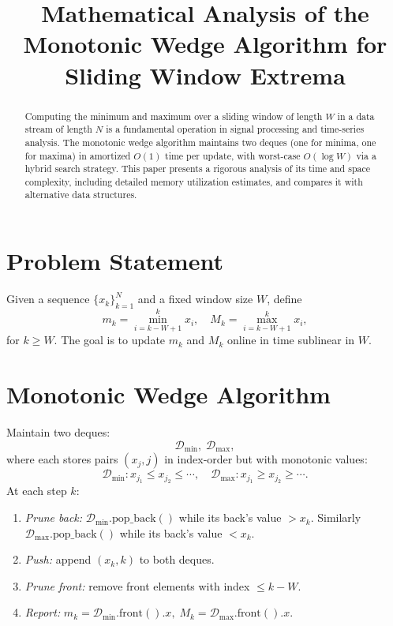 \documentclass[12pt]{article}
\title{Mathematical Analysis of the Monotonic Wedge Algorithm for Sliding Window Extrema}
\date{}
\begin{document}
\maketitle

\begin{abstract}
Computing the minimum and maximum over a sliding window of length \(W\) in a data stream of length \(N\) is a fundamental operation in signal processing and time-series analysis.  The monotonic wedge algorithm maintains two deques (one for minima, one for maxima) in amortized \(O(1)\) time per update, with worst-case \(O(\log W)\) via a hybrid search strategy.  This paper presents a rigorous analysis of its time and space complexity, including detailed memory utilization estimates, and compares it with alternative data structures.
\end{abstract}

\section{Problem Statement}
Given a sequence \(\{x_k\}_{k=1}^N\) and a fixed window size \(W\), define
\[
m_k = \min_{i=k-W+1}^k x_i,
\quad
M_k = \max_{i=k-W+1}^k x_i,
\]
for \(k\ge W\).  The goal is to update \(m_k\) and \(M_k\) online in time sublinear in \(W\).

\section{Monotonic Wedge Algorithm}
Maintain two deques:
\[
\mathcal{D}_{\min},\;\mathcal{D}_{\max},
\]
where each stores pairs \((x_j,j)\) in index‐order but with monotonic values:
\[
\mathcal{D}_{\min}: x_{j_1}\le x_{j_2}\le\cdots,
\quad
\mathcal{D}_{\max}: x_{j_1}\ge x_{j_2}\ge\cdots.
\]
At each step \(k\):
\begin{enumerate}
  \item \emph{Prune back:}
    \(\mathcal{D}_{\min}.\mathrm{pop\_back}()\) while its back’s value \(>x_k\).
    Similarly \(\mathcal{D}_{\max}.\mathrm{pop\_back}()\) while its back’s value \(<x_k\).
  \item \emph{Push:} append \((x_k,k)\) to both deques.
  \item \emph{Prune front:} remove front elements with index \(\le k-W\).
  \item \emph{Report:}  
    \(m_k=\mathcal{D}_{\min}.\mathrm{front}().x,\;M_k=\mathcal{D}_{\max}.\mathrm{front}().x.\)
\end{enumerate}
\end{document}
